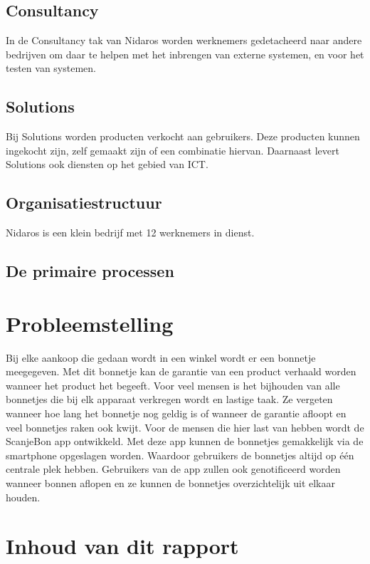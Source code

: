 \documentclass[a4paper,11pt,oneside]{report}
\begin{document}
\subsection{Consultancy}
In de Consultancy tak van Nidaros worden werknemers gedetacheerd naar andere bedrijven om daar te helpen met het inbrengen van externe systemen, en voor het testen van systemen.
\subsection{Solutions}
Bij Solutions worden producten verkocht aan gebruikers. Deze producten kunnen ingekocht zijn, zelf gemaakt zijn of een combinatie hiervan. Daarnaast levert Solutions ook diensten op het gebied van ICT.

\subsection{Organisatiestructuur}
Nidaros is een klein bedrijf met 12 werknemers in dienst.

\subsection{De primaire processen}
\lipsum[3]


\section{Probleemstelling}
Bij elke aankoop die gedaan wordt in een winkel wordt er een bonnetje meegegeven. Met dit bonnetje kan de garantie van een product verhaald worden wanneer het product het begeeft. Voor veel mensen is het bijhouden van alle bonnetjes die bij elk apparaat verkregen wordt en lastige taak. Ze vergeten wanneer hoe lang het bonnetje nog geldig is of wanneer de garantie afloopt en veel bonnetjes raken ook kwijt.
Voor de mensen die hier last van hebben wordt de ScanjeBon app ontwikkeld. Met deze app kunnen de bonnetjes gemakkelijk via de smartphone opgeslagen worden. Waardoor gebruikers de bonnetjes altijd op één centrale plek hebben. Gebruikers van de app zullen ook genotificeerd worden wanneer bonnen aflopen en ze kunnen de bonnetjes overzichtelijk uit elkaar houden.

\section{Inhoud van dit rapport}
\lipsum[5]
\end{document}
